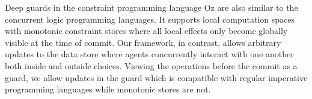 Deep guards in the constraint programming language 
Oz \cite{SchulteSW94, Mehl:diss}
are also similar to the concurrent logic programming languages.
It supports local computation spaces with
monotonic constraint stores where all local
effects only become globally visible at the time of commit. 
Our framework, in contrast, allows arbitrary updates to the
data store where agents concurrently interact with one another 
both inside and outside choices.
Viewing the operations before the commit as a guard, 
we allow updates in the guard which is compatible with regular 
imperative programming languages while monotonic stores are not.


